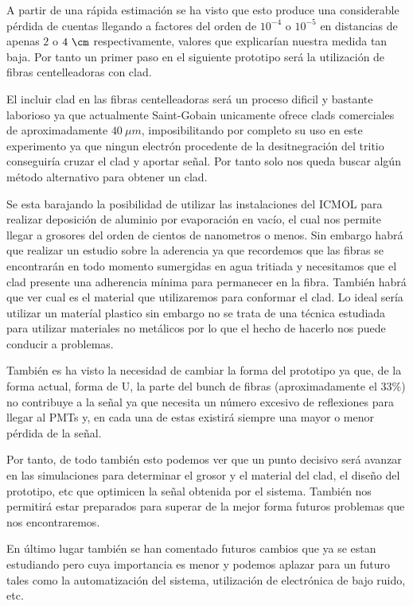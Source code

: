 A partir de una rápida estimación se ha visto que esto produce una considerable pérdida de cuentas llegando a factores del orden de $10^{-4}$ o $10^{-5}$ en distancias de apenas $2$ o $4~\cm$ respectivamente, valores que explicarían nuestra medida tan baja. Por tanto un primer paso en el siguiente prototipo será la utilización de fibras centelleadoras con clad. 

El incluir clad en las fibras centelleadoras será un proceso dificil y bastante laborioso ya que actualmente Saint-Gobain unicamente ofrece clads comerciales de aproximadamente $40~\mu m$, imposibilitando por completo su uso en este experimento ya que ningun electrón procedente de la desitnegración del tritio conseguiría cruzar el clad y aportar señal. Por tanto solo nos queda buscar algún método alternativo para obtener un clad. 

Se esta barajando la posibilidad de utilizar las instalaciones del ICMOL para realizar deposición de aluminio por evaporación en vacío, el cual nos permite llegar a grosores del orden de cientos de nanometros o menos. Sin embargo habrá que realizar un estudio sobre la aderencia ya que recordemos que las fibras se encontrarán en todo momento sumergidas en agua tritiada y necesitamos que el clad presente una adherencia mínima para permanecer en la fibra. También habrá que ver cual es el material que utilizaremos para conformar el clad. Lo ideal sería utilizar un materíal plastico sin embargo no se trata de una técnica estudiada para utilizar materiales no metálicos por lo que el hecho de hacerlo nos puede conducir a problemas.

También es ha visto la necesidad de cambiar la forma del prototipo ya que, de la forma actual, forma de U, la parte del bunch de fibras (aproximadamente el $33\%$) no contribuye a la señal ya que necesita un número excesivo de reflexiones para llegar al PMTs y, en cada una de estas existirá siempre una mayor o menor pérdida de la señal.

Por tanto, de todo también esto podemos ver que un punto decisivo será avanzar en las simulaciones para determinar el grosor y el material del clad, el diseño del prototipo, etc que optimicen la señal obtenida por el sistema. También nos permitirá estar preparados para superar de la mejor forma futuros problemas que nos encontraremos.

En último lugar también se han comentado futuros cambios que ya se estan estudiando pero cuya importancia es menor y podemos aplazar para un futuro tales como la automatización del sistema, utilización de electrónica de bajo ruido, etc.